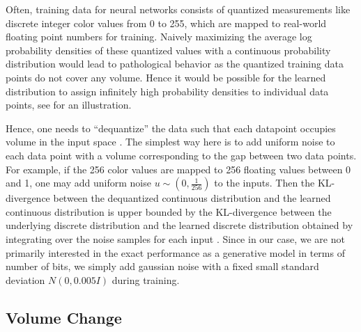     

    Often, training data for neural networks consists of quantized
measurements like discrete integer color values from 0 to 255, which are
mapped to real-world floating point numbers for training. Naively
maximizing the average log probability densities of these quantized
values with a continuous probability distribution would lead to
pathological behavior as the quantized training data points do not cover
any volume. Hence it would be possible for the learned distribution to
assign infinitely high probability densities to individual data points,
see  for an illustration.

Hence, one needs to ``dequantize'' the data such that each datapoint
occupies volume in the input space
\citep{DBLP:journals/corr/DinhSB16,DBLP:conf/icml/HoCSDA19}.
The simplest way here is to add uniform noise to each data point with a
volume corresponding to the gap between two data points. For example, if
the 256 color values are mapped to 256 floating values between 0 and 1,
one may add uniform noise $u\sim(0,\frac{1}{256})$ to the inputs. Then
the KL-divergence between the dequantized continuous distribution and
the learned continuous distribution is upper bounded by the
KL-divergence between the underlying discrete distribution and the
learned discrete distribution obtained by integrating over the noise
samples for each input \citep{DBLP:journals/corr/TheisOB15}.
Since in our case, we are not primarily interested in the exact
performance as a generative model in terms of number of bits, we simply
add gaussian noise with a fixed small standard deviation $N(0,0.005I)$
during training.

\subsection{Volume Change}\label{volume-change}

